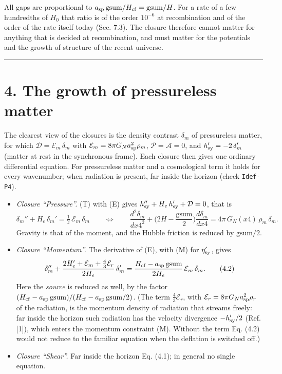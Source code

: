 \documentclass[
  10pt,
]{article}
\providecommand{\tightlist}{%
  \setlength{\itemsep}{0pt}\setlength{\parskip}{0pt}}
\begin{document}
All gaps are proportional to
\(a_{\rm sp}\,\mathrm{gsum}/H_{\rm cf}=\mathrm{gsum}/H\). For a rate of
a few hundredths of \(H_0\) that ratio is of the order \(10^{-6}\) at
recombination and of the order of the rate itself today (Sec. 7.3). The
closure therefore cannot matter for anything that is decided at
recombination, and must matter for the potentials and the growth of
structure of the recent universe.

\begin{center}\rule{0.5\linewidth}{0.5pt}\end{center}

\hypertarget{the-growth-of-pressureless-matter}{%
\section{4. The growth of pressureless
matter}\label{the-growth-of-pressureless-matter}}

The clearest view of the closures is the density contrast \(\delta_m\)
of pressureless matter, for which \(\mathcal D=\mathcal E_m\,\delta_m\)
with \(\mathcal E_m=8\pi G_Na_{\rm sp}^2\rho_m\),
\(\mathcal P=\mathcal A=0\), and \(h_{\rm sy}'=-2\,\delta_m'\) (matter
at rest in the synchronous frame). Each closure then gives one ordinary
differential equation. For pressureless matter and a cosmological term
it holds for every wavenumber; when radiation is present, far inside the
horizon (check \texttt{Idef-P4}).

\begin{itemize}
\tightlist
\item
  \emph{Closure ``Pressure''.} (T) with (E) gives
  \(h_{\rm sy}''+H_e\,h_{\rm sy}'+\mathcal D=0\), that is
  \[\delta_m''+H_e\,\delta_m'=\tfrac12\,\mathcal E_m\,\delta_m
  \qquad\Longleftrightarrow\qquad
  \frac{d^2\delta_m}{dx4^2}+\Big(2H-\frac{\mathrm{gsum}}{2}\Big)\frac{d\delta_m}{dx4}=4\pi\,G_N(x4)\,\rho_m\,\delta_m .\tag{4.1}\]
  Gravity is that of the moment, and the Hubble friction is reduced by
  \(\mathrm{gsum}/2\).
\item
  \emph{Closure ``Momentum''.} The derivative of (E), with (M) for
  \(\eta_{\rm sy}'\), gives
  \[\delta_m''+\frac{2H_e'+\mathcal E_m+\tfrac43\mathcal E_r}{2H_e}\,\delta_m'=\frac{H_{\rm cf}-a_{\rm sp}\,\mathrm{gsum}}{2H_e}\,\mathcal E_m\,\delta_m .\tag{4.2}\]
  Here the \emph{source} is reduced as well, by the factor
  \((H_{\rm cf}-a_{\rm sp}\,\mathrm{gsum})/(H_{\rm cf}-a_{\rm sp}\,\mathrm{gsum}/2)\).
  (The term \(\tfrac43\mathcal E_r\), with
  \(\mathcal E_r=8\pi G_Na_{\rm sp}^2\rho_r\) of the radiation, is the
  momentum density of radiation that streams freely: far inside the
  horizon such radiation has the velocity divergence \(-h_{\rm sy}'/2\)
  (Ref. {[}1{]}), which enters the momentum constraint (M). Without the
  term Eq. (4.2) would not reduce to the familiar equation when the
  deflation is switched off.)
\item
  \emph{Closure ``Shear''.} Far inside the horizon Eq. (4.1); in general
  no single equation.
\end{itemize}
\end{document}

